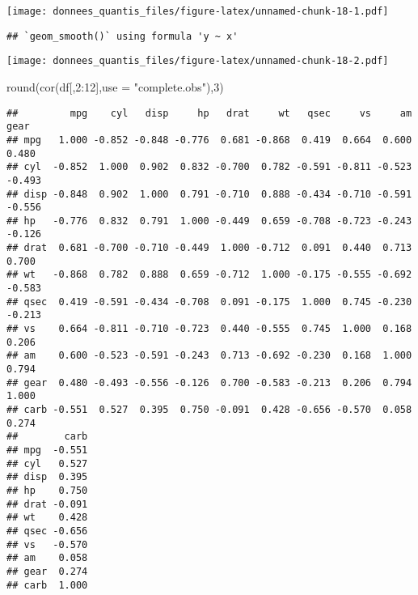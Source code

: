 \documentclass[
]{article}
\newenvironment{Shaded}{\begin{snugshade}}{\end{snugshade}}
\newcommand{\AttributeTok}[1]{\textcolor[rgb]{0.77,0.63,0.00}{#1}}
\newcommand{\ConstantTok}[1]{\textcolor[rgb]{0.00,0.00,0.00}{#1}}
\newcommand{\DecValTok}[1]{\textcolor[rgb]{0.00,0.00,0.81}{#1}}
\newcommand{\FunctionTok}[1]{\textcolor[rgb]{0.00,0.00,0.00}{#1}}
\newcommand{\NormalTok}[1]{#1}
\newcommand{\SpecialCharTok}[1]{\textcolor[rgb]{0.00,0.00,0.00}{#1}}
\newcommand{\StringTok}[1]{\textcolor[rgb]{0.31,0.60,0.02}{#1}}
\begin{document}
\texttt{[image: donnees\_quantis\_files/figure-latex/unnamed-chunk-18-1.pdf]}

\begin{Shaded}
\end{Shaded}

\begin{verbatim}
## `geom_smooth()` using formula 'y ~ x'
\end{verbatim}

\texttt{[image: donnees\_quantis\_files/figure-latex/unnamed-chunk-18-2.pdf]}

\begin{Shaded}
\begin{Highlighting}[]
\FunctionTok{round}\NormalTok{(}\FunctionTok{cor}\NormalTok{(df[,}\DecValTok{2}\SpecialCharTok{:}\DecValTok{12}\NormalTok{],}\AttributeTok{use =} \StringTok{"complete.obs"}\NormalTok{),}\DecValTok{3}\NormalTok{)}
\end{Highlighting}
\end{Shaded}

\begin{verbatim}
##         mpg    cyl   disp     hp   drat     wt   qsec     vs     am   gear
## mpg   1.000 -0.852 -0.848 -0.776  0.681 -0.868  0.419  0.664  0.600  0.480
## cyl  -0.852  1.000  0.902  0.832 -0.700  0.782 -0.591 -0.811 -0.523 -0.493
## disp -0.848  0.902  1.000  0.791 -0.710  0.888 -0.434 -0.710 -0.591 -0.556
## hp   -0.776  0.832  0.791  1.000 -0.449  0.659 -0.708 -0.723 -0.243 -0.126
## drat  0.681 -0.700 -0.710 -0.449  1.000 -0.712  0.091  0.440  0.713  0.700
## wt   -0.868  0.782  0.888  0.659 -0.712  1.000 -0.175 -0.555 -0.692 -0.583
## qsec  0.419 -0.591 -0.434 -0.708  0.091 -0.175  1.000  0.745 -0.230 -0.213
## vs    0.664 -0.811 -0.710 -0.723  0.440 -0.555  0.745  1.000  0.168  0.206
## am    0.600 -0.523 -0.591 -0.243  0.713 -0.692 -0.230  0.168  1.000  0.794
## gear  0.480 -0.493 -0.556 -0.126  0.700 -0.583 -0.213  0.206  0.794  1.000
## carb -0.551  0.527  0.395  0.750 -0.091  0.428 -0.656 -0.570  0.058  0.274
##        carb
## mpg  -0.551
## cyl   0.527
## disp  0.395
## hp    0.750
## drat -0.091
## wt    0.428
## qsec -0.656
## vs   -0.570
## am    0.058
## gear  0.274
## carb  1.000
\end{verbatim}
\end{document}
